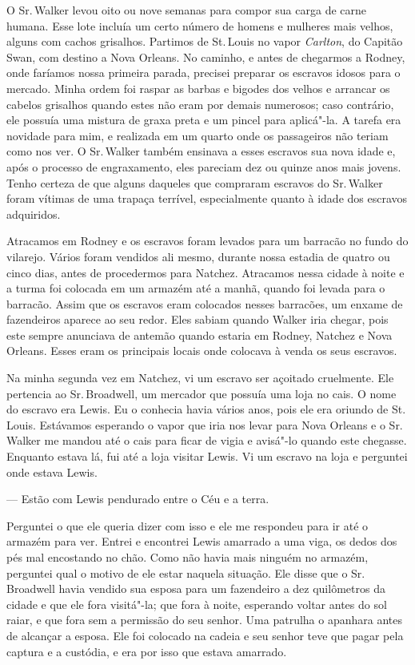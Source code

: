 O Sr.\,Walker levou oito ou nove semanas para compor sua carga de carne
humana. Esse lote incluía um certo número de homens e mulheres mais
velhos, alguns com cachos grisalhos. Partimos de St.\,Louis no vapor
\emph{Carlton}, do Capitão Swan, com destino a Nova Orleans. No caminho,
e antes de chegarmos a Rodney, onde faríamos nossa primeira parada,
precisei preparar os escravos idosos para o mercado. Minha ordem foi
raspar as barbas e bigodes dos velhos e arrancar os cabelos grisalhos
quando estes não eram por demais numerosos; caso contrário, ele possuía
uma mistura de graxa preta e um pincel para aplicá"-la. A tarefa era \label{ref7}
novidade para mim, e realizada em um quarto onde os passageiros não
teriam como nos ver. O Sr.\,Walker também ensinava a esses escravos sua
nova idade e, após o processo de engraxamento, eles pareciam dez ou
quinze anos mais jovens. Tenho certeza de que alguns daqueles que
compraram escravos do Sr.\,Walker foram vítimas de uma trapaça terrível,
especialmente quanto à idade dos escravos adquiridos.

Atracamos em Rodney e os escravos foram levados para um barracão no
fundo do vilarejo. Vários foram vendidos ali mesmo, durante nossa
estadia de quatro ou cinco dias, antes de procedermos para Natchez.
Atracamos nessa cidade à noite e a turma foi colocada em um armazém até
a manhã, quando foi levada para o barracão. Assim que os escravos eram
colocados nesses barracões, um enxame de fazendeiros aparece ao seu
redor. Eles sabiam quando Walker iria chegar, pois este sempre anunciava
de antemão quando estaria em Rodney, Natchez e Nova Orleans. Esses eram
os principais locais onde colocava à venda os seus escravos.

Na minha segunda vez em Natchez, vi um escravo ser açoitado cruelmente.
Ele pertencia ao Sr.\,Broadwell, um mercador que possuía uma loja no
cais. O nome do escravo era Lewis. Eu o conhecia havia vários anos, pois
ele era oriundo de St.\,Louis. Estávamos esperando o vapor que iria nos
levar para Nova Orleans e o Sr.\,Walker me mandou até o cais para ficar
de vigia e avisá"-lo quando este chegasse. Enquanto estava lá, fui até a
loja visitar Lewis. Vi um escravo na loja e perguntei onde estava Lewis.

--- Estão com Lewis pendurado entre o Céu e a terra.

Perguntei o que ele queria dizer com isso e ele me respondeu para ir até
o armazém para ver. Entrei e encontrei Lewis amarrado a uma viga, os
dedos dos pés mal encostando no chão. Como não havia mais ninguém no
armazém, perguntei qual o motivo de ele estar naquela situação. Ele
disse que o Sr.\,Broadwell havia vendido sua esposa para um fazendeiro a
dez quilômetros da cidade e que ele fora visitá"-la; que fora à noite,
esperando voltar antes do sol raiar, e que fora sem a permissão do seu
senhor. Uma patrulha o apanhara antes de alcançar a esposa. Ele foi
colocado na cadeia e seu senhor teve que pagar pela captura e a
custódia, e era por isso que estava amarrado.

